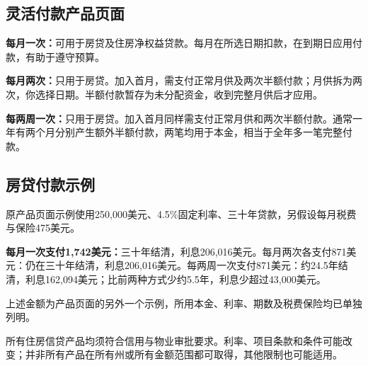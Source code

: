 \documentclass[UTF8,fontset=none,11pt,a4paper]{ctexart}
\begin{document}
\subsection*{灵活付款产品页面}
\textbf{每月一次：}可用于房贷及住房净权益贷款。每月在所选日期扣款，在到期日应用付款，有助于遵守预算。


\textbf{每月两次：}只用于房贷。加入首月，需支付正常月供及两次半额付款；月供拆为两次，你选择日期。半额付款暂存为未分配资金，收到完整月供后才应用。


\textbf{每两周一次：}只用于房贷。加入首月同样需支付正常月供和两次半额付款。通常一年有两个月分别产生额外半额付款，两笔均用于本金，相当于全年多一笔完整付款。


\subsection*{房贷付款示例}
原产品页面示例使用250,000美元、4.5\%固定利率、三十年贷款，另假设每月税费与保险475美元。


\textbf{每月一次支付1,742美元：}三十年结清，利息206,016美元。每月两次各支付871美元：仍在三十年结清，利息206,016美元。每两周一次支付871美元：约24.5年结清，利息162,094美元；比前两种方式少约5.5年，利息少超过43,000美元。


上述金额为产品页面的另外一个示例，所用本金、利率、期数及税费保险均已单独列明。


所有住房信贷产品均须符合信用与物业审批要求。利率、项目条款和条件可能改变；并非所有产品在所有州或所有金额范围都可取得，其他限制也可能适用。
\end{document}
